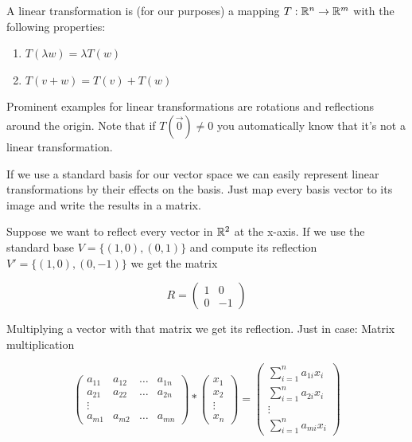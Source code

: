 \begin{Def} A linear transformation is (for our purposes) a mapping $T : \mathbb{R}^n \rightarrow \mathbb{R}^m$ with the following properties:

\begin{enumerate}
\item $T(\lambda w) = \lambda T(w)$
\item $T(v+w) = T(v)+T(w)$
\end{enumerate}
\end{Def}

Prominent examples for linear transformations are rotations and reflections around the origin. Note that if $T(\vec 0)\neq 0$ you automatically know that it's not a linear transformation.

If we use a standard basis for our vector space we can easily represent linear transformations by their effects on the basis. Just map every basis vector to its image and write the results in a matrix. 

\begin{Ex}[Reflection] Suppose we want to reflect every vector in $\mathbb{R}^2$ at the x-axis. If we use the standard base $V = \{(1,0),(0,1)\}$ and compute its reflection $V'=\{(1,0),(0,-1)\}$ we get the matrix

\[R = \begin{pmatrix}
1 & 0 \\
0 & -1
\end{pmatrix}\]

Multiplying a vector with that matrix we get its reflection. Just in case: Matrix multiplication

\[\begin{pmatrix}
a_{11} & a_{12} & \ldots & a_{1n}\\
a_{21} & a_{22} & \ldots & a_{2n}\\
\vdots \\
a_{m1} & a_{m2} & \ldots & a_{mn}
\end{pmatrix} * \begin{pmatrix}x_1\\x_2\\\vdots\\x_n\end{pmatrix} =\begin{pmatrix} \sum_{i=1}^n a_{1i}x_i\\ \sum_{i=1}^n a_{2i}x_i\\\vdots\\\sum_{i=1}^n a_{mi}x_i\end{pmatrix}\]

\end{Ex}

